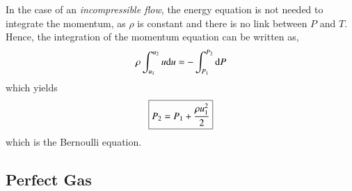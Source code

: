 \documentclass{warpdoc}
\numberwithin{equation}{section}
\newcommand{\mfd}{\displaystyle}
\newcommand{\ordi}{{\rm d}}
\newcommand\frameeqn[1]{\fbox{$#1$}}
\begin{document}
In the case of
an \emph{incompressible flow}, the energy equation is not needed to integrate the
momentum, as $\rho$ is constant and there is no link between $P$ and $T$. Hence,
the integration of the momentum equation can be written as,
%
\begin{equation}
  \rho \int_{u_1}^{u_2} u \ordi u = - \int_{P_1}^{P_2} \ordi P
\end{equation}
%
which yields
%
\begin{equation}
  \frameeqn{
    \mfd P_2 = P_1 + \frac{\rho u_1^2}{2}
  }
\end{equation}
%
which is the Bernoulli equation.



\subsection{Perfect Gas}
\end{document}
